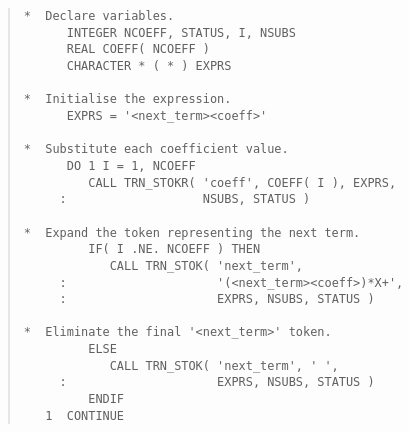 \begin{quote}
\begin{tabbing} %

\verb#*  Declare variables.                                  #\\
\verb#      INTEGER NCOEFF, STATUS, I, NSUBS                 #\\
\verb#      REAL COEFF( NCOEFF )                             #\\
\verb#      CHARACTER * ( * ) EXPRS                          #\\
\verb#                                                       #\\
\verb#*  Initialise the expression.                          #\\
\verb#      EXPRS = '<next_term><coeff>'                     #\\
\verb#                                                       #\\
\verb#*  Substitute each coefficient value.                  #\\
\verb#      DO 1 I = 1, NCOEFF                               #\\
\verb#         CALL TRN_STOKR( 'coeff', COEFF( I ), EXPRS,   #\\
\verb#     :                   NSUBS, STATUS )               #\\
\verb#                                                       #\\
\verb#*  Expand the token representing the next term.        #\\
\verb#         IF( I .NE. NCOEFF ) THEN                      #\\
\verb#            CALL TRN_STOK( 'next_term',                #\\
\verb#     :                     '(<next_term><coeff>)*X+',  #\\
\verb#     :                     EXPRS, NSUBS, STATUS )      #\\
\verb#                                                       #\\
\verb#*  Eliminate the final '<next_term>' token.            #\\
\verb#         ELSE                                          #\\
\verb#            CALL TRN_STOK( 'next_term', ' ',           #\\
\verb#     :                     EXPRS, NSUBS, STATUS )      #\\
\verb#         ENDIF                                         #\\
\verb#   1  CONTINUE                                         #\\

\end{tabbing}
\end{quote}

